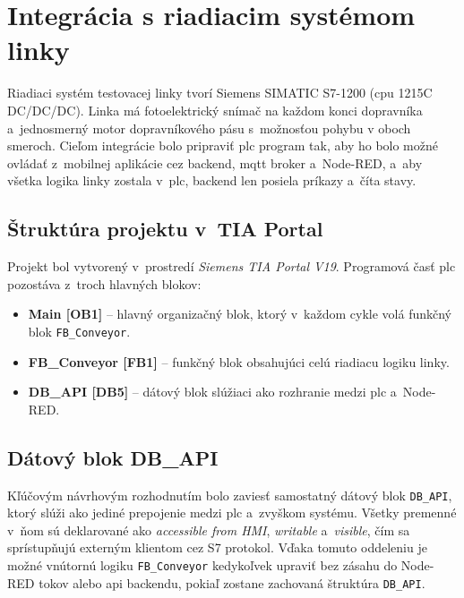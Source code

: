 \section{Integrácia s riadiacim systémom linky}\label{sec:plc_integration}

Riadiaci systém testovacej linky tvorí Siemens SIMATIC S7-1200
(\acrshort{cpu} 1215C DC/DC/DC). Linka má fotoelektrický snímač na
každom konci dopravníka a~jednosmerný motor dopravníkového
pásu s~možnosťou pohybu v oboch smeroch. Cieľom integrácie bolo pripraviť \acrshort{plc}
program tak, aby ho bolo možné ovládať z~mobilnej aplikácie cez
backend, \acrshort{mqtt} broker a~Node-RED, a~aby všetka logika linky zostala
v~\acrshort{plc}, backend len posiela príkazy a~číta stavy.

\subsection{Štruktúra projektu v~TIA Portal}

Projekt bol vytvorený v~prostredí \textit{Siemens TIA Portal V19}. Programová
časť \acrshort{plc} pozostáva z~troch hlavných blokov:
\begin{itemize}
      \item \textbf{Main [OB1]} -- hlavný organizačný blok, ktorý
            v~každom cykle volá funkčný blok \texttt{FB\_Conveyor}.
      \item \textbf{FB\_Conveyor [FB1]} -- funkčný blok obsahujúci celú
            riadiacu logiku linky.
      \item \textbf{DB\_API [DB5]} -- dátový blok slúžiaci ako rozhranie
            medzi \acrshort{plc} a~Node-RED.
\end{itemize}

\subsection{Dátový blok DB\_API}

Kľúčovým návrhovým rozhodnutím bolo zaviesť samostatný dátový blok
\texttt{DB\_API}, ktorý slúži ako jediné prepojenie medzi \acrshort{plc}
a~zvyškom systému. Všetky premenné v~ňom sú deklarované ako
\textit{accessible from HMI}, \textit{writable} a~\textit{visible}, čím sa
sprístupňujú externým klientom cez S7 protokol. Vďaka tomuto oddeleniu je
možné vnútornú logiku \texttt{FB\_Conveyor} kedykoľvek upraviť bez zásahu do
Node-RED tokov alebo \acrshort{api} backendu, pokiaľ zostane zachovaná
štruktúra \texttt{DB\_API}.

